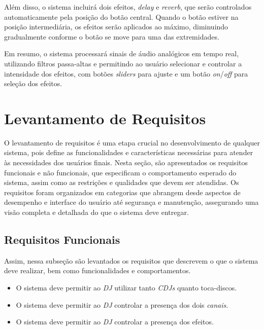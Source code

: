 Além disso, o sistema incluirá dois efeitos, \textit{delay} e \textit{reverb}, que serão controlados automaticamente pela posição do botão central. Quando o botão estiver na posição intermediária, os efeitos serão aplicados ao máximo, diminuindo gradualmente conforme o botão se move para uma das extremidades.

Em resumo, o sistema processará sinais de áudio analógicos em tempo real, utilizando filtros passa-altas e permitindo ao usuário selecionar e controlar a intensidade dos efeitos, com botões \textit{sliders} para ajuste e um botão \textit{on}/\textit{off} para seleção dos efeitos.

\section{Levantamento de Requisitos}

O levantamento de requisitos é uma etapa crucial no desenvolvimento de qualquer sistema, pois define as funcionalidades e características necessárias para atender às necessidades dos usuários finais. Nesta seção, são apresentados os requisitos funcionais e não funcionais, que especificam o comportamento esperado do sistema, assim como as restrições e qualidades que devem ser atendidas. Os requisitos foram organizados em categorias que abrangem desde aspectos de desempenho e interface do usuário até segurança e manutenção, assegurando uma visão completa e detalhada do que o sistema deve entregar.

\subsection{Requisitos Funcionais}

Assim, nessa subseção são levantados os requisitos que descrevem o que o sistema deve realizar, bem como funcionalidades e comportamentos.
\begin{itemize}
    \item O sistema deve permitir ao \textit{DJ} utilizar tanto \textit{CDJs} quanto toca-discos.
    \item O sistema deve permitir ao \textit{DJ} controlar a presença dos dois \textit{canais}.
    \item O sistema deve permitir ao \textit{DJ} controlar a presença dos efeitos.
\end{itemize}

